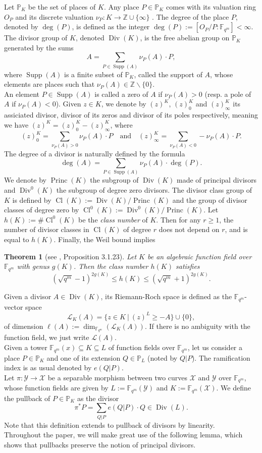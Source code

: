 \documentclass[10pt]{article}
\newtheorem{thm}{Theorem}
\theoremstyle{definition}
\theoremstyle{definition}
\theoremstyle{definition}
\newcommand{\cd}{\cdot}
\newcommand{\Z}{\mathbb{Z}}
\newcommand{\PP}{\mathbb{P}}
\newcommand{\fqm}{\mathbb{F}_{q^m}}
\newcommand{\su}{\subseteq}
\newcommand{\X}{\mathcal{X}}
\newcommand{\Y}{\mathcal{Y}}
\newcommand{\Div}{\operatorname{Div}}
\newcommand{\Princ}{\operatorname{Princ}}
\newcommand{\Cl}{\operatorname{Cl}}
\newcommand{\Supp}{\operatorname{Supp}}
\newcommand{\calL}{\mathcal{L}}
\begin{document}
\noindent Let $\PP_K$ be the set of places of $K$. Any place $P \in \PP_K$ comes with its valuation ring $O_P$ and its discrete valuation $\nu_P : K \rightarrow \Z \cup \{\infty\}$ . The degree of the place $P$, denoted by $\deg(P)$, is defined as the  integer $\deg(P) :=  [O_P/P:\fqm] < \infty$.
The divisor group of $K$, denoted $\Div(K)$, is the free abelian group on $\mathbb{P}_K$ generated by the sums
\[A = \sum\limits_{P \in \Supp(A)} \nu_P(A) \cd P,\]
where $\Supp(A)$ is a finite subset of $\PP_K$, called the support of $A$, whose elements are places such that $\nu_{P}(A) \in \Z \backslash \{0\}$. \\ 
An element $P \in \Supp(A)$ is called a zero of $A$ if $\nu_P(A) >0$ (resp. a pole of $A$ if $\nu_P(A) < 0$). Given $z \in K$, we denote by $(z)^K$, $(z)^K_0$ and $(z)^K_{\infty}$ its assiciated divisor, divisor of its zeros and divisor of its poles respectively, meaning we have $(z)^K = (z)^K_0 - (z)^K_{\infty}$, where 
\[(z)^K_0 = \sum\limits_{\nu_P(A) > 0}\nu_P(A) \cd P \quad \textrm{and}  \quad (z)^K_{\infty} = \sum\limits_{\nu_P(A) < 0}-\nu_P(A) \cd P.\]
The degree of a divisor is naturally defined by the formula
\[\deg(A) = \sum\limits_{P \in \Supp(A)} \nu_P(A) \cd \deg( P).\]
We denote by $\Princ(K)$ the subgroup of $\Div(K)$ made of principal divisors and $\Div^0(K)$ the subgroup of degree zero divisors. The divisor class group of $K$ is defined by $\Cl(K):=\Div(K)/\Princ(K)$ and the group of divisor classes of degree zero by $\Cl^0(K):=\Div^0(K)/\Princ(K)$. 
Let $h(K):= \# \Cl^0(K)$ be the \emph{class number} of $K$. Then for any $r \geq 1$, the number of divisor classes in $\Cl(K)$ of degree $r$ does not depend on $r$, and is equal to $h(K)$. Finally, the Weil bound implies

\begin{thm}[see \cite{Tsf}, Proposition 3.1.23]\label{esti h(X)}
Let $K$ be an algebraic function field over $\fqm$ with genus $g(K)$. Then the class number $h(K)$ satisfies
\[ (\sqrt{q^m}-1)^{2g(K)} \leq h(K) \leq (\sqrt{q^m}+1)^{2g(K)}.\]
\end{thm}

Given a divisor $A \in \Div(K)$, its Riemann-Roch space is defined as the $\fqm$-vector space
\[\calL_K(A) = \{z \in K \ | \ (z)^L \geq -A\} \cup \{0\},\]
of dimension $\ell(A):= \dim_{\fqm}(\calL_K(A))$. If there is no ambiguity with the function field, we just write $\calL(A)$. \\
Given a tower $\fqm(x) \su K \su L$ of function fields over $\fqm$, let us consider a place  $P \in \PP_K$ and one of its extension $Q \in \PP_L$ (noted by $Q|P$). The ramification index is as usual denoted by $e(Q|P)$. \\
Let $\pi : \Y \rightarrow \X$ be a separable morphism between two curves $\X$ and $\Y$ over $\fqm$, whose function fields are given by $L := \fqm(\Y)$ and $K:=\fqm(\X)$. We define the pullback of $P \in \PP_K$ as the divisor
\[\pi^{*}P = \sum\limits_{Q|P} e(Q|P) \cd Q \in \Div(L).\]
Note that this definition extends to pullback of divisors by linearity. \\
Throughout the paper, we will make great use of the following lemma, which shows that pullbacks preserve the notion of principal divisors.
\end{document}
